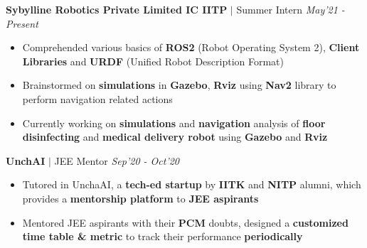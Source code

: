 \documentclass[9pt]{extarticle}
\begin{document}
\hspace{-1.5mm}\textbf{Sybylline Robotics Private Limited IC IITP} $|$ Summer Intern
\hfill\hfill\textit{May'21 - Present}
\begin{itemize}
\item Comprehended various basics of \textbf{ROS2} (Robot Operating System 2), \textbf{Client Libraries}  and \textbf{URDF} (Unified Robot Description Format)
\item Brainstormed on \textbf{simulations} in \textbf{Gazebo}, \textbf{Rviz} using \textbf{Nav2} library to perform navigation related actions 
\item Currently working on \textbf{simulations} and \textbf{navigation} analysis of \textbf{floor disinfecting} and \textbf{medical delivery robot} using \textbf{Gazebo} and \textbf{Rviz} 
\end{itemize}
\vspace{2mm}

\hspace{-1.5mm}\textbf{UnchAI} $|$ JEE Mentor
\hfill\hfill\textit{Sep'20 - Oct'20}
\begin{itemize}
\item Tutored in UnchaAI, a \textbf{tech-ed startup} by \textbf{IITK} and \textbf{NITP} alumni, which provides a \textbf{mentorship platform} to \textbf{JEE aspirants}
\item  Mentored JEE aspirants with their \textbf{PCM} doubts, designed a \textbf{customized time table \& metric} to track their performance \textbf{periodically}
\end{itemize}
\vspace{-1.5mm}
\end{document}
